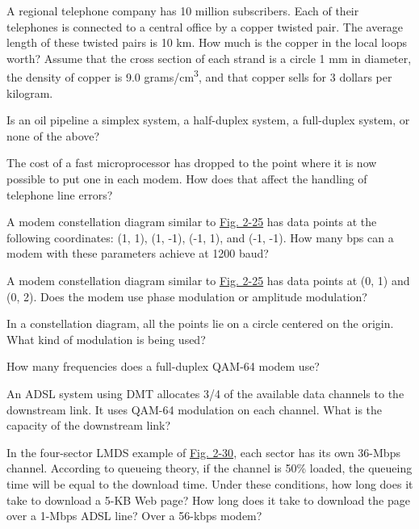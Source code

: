 \documentclass[b5paper,11pt]{memoir}
\begin{document}
{}

A regional telephone company has 10 million subscribers. Each of their
telephones is connected to a central office by a copper twisted pair.
The average length of these twisted pairs is 10 km. How much is the
copper in the local loops worth? Assume that the cross section of each
strand is a circle 1 mm in diameter, the density of copper is 9.0
grams/cm\textsuperscript{3}, and that copper sells for 3 dollars per
kilogram.

{}

Is an oil pipeline a simplex system, a half-duplex system, a full-duplex
system, or none of the above?

{}

The cost of a fast microprocessor has dropped to the point where it is
now possible to put one in each modem. How does that affect the handling
of telephone line errors?

{}

A modem constellation diagram similar to
\protect\hyperlink{0130661023_ch02lev1sec5.htmlux5cux23ch02fig25}{Fig.
2-25} has data points at the following coordinates: (1, 1), (1, -1),
(-1, 1), and (-1, -1). How many bps can a modem with these parameters
achieve at 1200 baud?

{}

A modem constellation diagram similar to
\protect\hyperlink{0130661023_ch02lev1sec5.htmlux5cux23ch02fig25}{Fig.
2-25} has data points at (0, 1) and (0, 2). Does the modem use phase
modulation or amplitude modulation?

{}

In a constellation diagram, all the points lie on a circle centered on
the origin. What kind of modulation is being used?

{}

How many frequencies does a full-duplex QAM-64 modem use?

{}

An ADSL system using DMT allocates 3/4 of the available data channels to
the downstream link. It uses QAM-64 modulation on each channel. What is
the capacity of the downstream link?

{}

In the four-sector LMDS example of
\protect\hyperlink{0130661023_ch02lev1sec5.htmlux5cux23ch02fig30}{Fig.
2-30}, each sector has its own 36-Mbps channel. According to queueing
theory, if the channel is 50\% loaded, the queueing time will be equal
to the download time. Under these conditions, how long does it take to
download a 5-KB Web page? How long does it take to download the page
over a 1-Mbps ADSL line? Over a 56-kbps modem?
\end{document}
